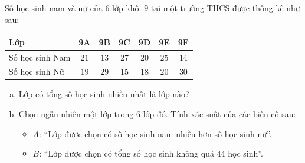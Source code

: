 \begin{bt}%
Số học sinh nam và nữ của $6$ lớp khối $9$ tại một trường THCS được thống kê như sau:
\begin{center}
\begin{tabular}{|l|c|c|c|c|c|c|}
\hline
\textbf{Lớp} & \textbf{9A} & \textbf{9B} & \textbf{9C} & \textbf{9D} & \textbf{9E} & \textbf{9F} \\ \hline
Số học sinh Nam & $21$ & $13$ & $27$ & $20$ & $25$ & $14$ \\ \hline
Số học sinh Nữ & $19$ & $29$ & $15$ & $18$ & $20$ & $30$ \\ \hline
\end{tabular}
\end{center}
\begin{enumerate}[a)]
    \item Lớp có tổng số học sinh nhiều nhất là lớp nào?
    \item Chọn ngẫu nhiên một lớp trong $6$ lớp đó. Tính xác suất của các biến cố sau:
    \begin{itemize}
        \item $A$: ``Lớp được chọn có số học sinh nam nhiều hơn số học sinh nữ''.
        \item $B$: ``Lớp được chọn có tổng số học sinh không quá $44$ học sinh''.
    \end{itemize}
\end{enumerate}
\end{bt}
